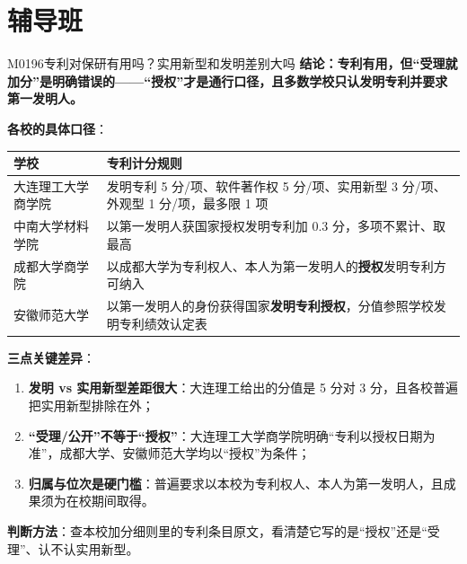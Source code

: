 \section{辅导班}
\begin{qa}{M0196}{专利对保研有用吗？实用新型和发明差别大吗}
\textbf{结论：专利有用，但“受理就加分”是明确错误的——“授权”才是通行口径，且多数学校只认发明专利并要求第一发明人。}

\textbf{各校的具体口径}：
\par\vspace{2pt}\nobreak\begin{center}\footnotesize
\begin{tabularx}{\textwidth}{>{\raggedright\arraybackslash}X>{\raggedright\arraybackslash}X}
\toprule
\textbf{学校} & \textbf{专利计分规则} \\ \midrule
大连理工大学商学院 & 发明专利 5 分/项、软件著作权 5 分/项、实用新型 3 分/项、外观型 1 分/项，最多限 1 项 \\
中南大学材料学院 & 以第一发明人获国家授权发明专利加 0.3 分，多项不累计、取最高 \\
成都大学商学院 & 以成都大学为专利权人、本人为第一发明人的\textbf{授权}发明专利方可纳入 \\
安徽师范大学 & 以第一发明人的身份获得国家\textbf{发明专利授权}，分值参照学校发明专利绩效认定表 \\
\bottomrule
\end{tabularx}
\end{center}\vspace{2pt}\par

\textbf{三点关键差异}：
\begin{enumerate}
  \item \textbf{发明 vs 实用新型差距很大}：大连理工给出的分值是 5 分对 3 分，且各校普遍把实用新型排除在外；
  \item \textbf{“受理/公开”不等于“授权”}：大连理工大学商学院明确“专利以授权日期为准”，成都大学、安徽师范大学均以“授权”为条件；
  \item \textbf{归属与位次是硬门槛}：普遍要求以本校为专利权人、本人为第一发明人，且成果须为在校期间取得。
\end{enumerate}

\textbf{判断方法}：查本校加分细则里的专利条目原文，看清楚它写的是“授权”还是“受理”、认不认实用新型。
\end{qa}


